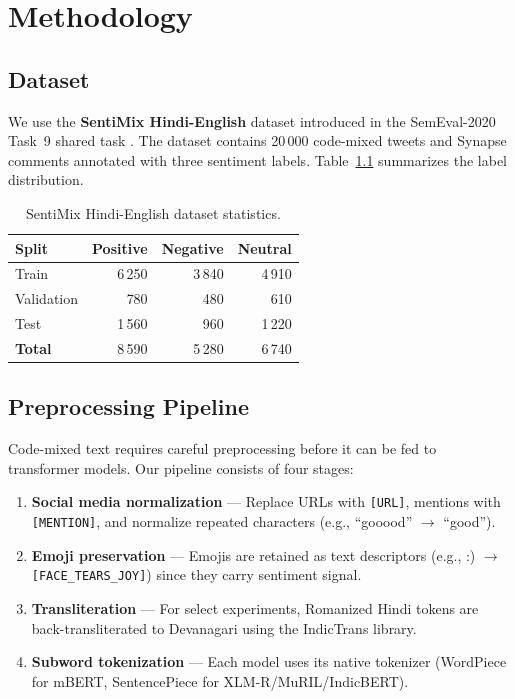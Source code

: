 \documentclass[12pt,a4paper]{report}
\begin{document}
\chapter{Methodology}

\section{Dataset}

We use the \textbf{SentiMix Hindi-English} dataset introduced in the SemEval-2020 Task~9 shared task \cite{patwa2020}. The dataset contains 20\,000 code-mixed tweets and Synapse comments annotated with three sentiment labels. Table~\ref{tab:dataset} summarizes the label distribution.

\begin{table}[htbp]
\centering
\caption{SentiMix Hindi-English dataset statistics.}
\label{tab:dataset}
\begin{tabular}{@{}lrrr@{}}
\toprule
\textbf{Split} & \textbf{Positive} & \textbf{Negative} & \textbf{Neutral} \\
\midrule
Train      & 6\,250 & 3\,840 & 4\,910 \\
Validation &   780  &   480  &   610  \\
Test       & 1\,560 &   960  & 1\,220 \\
\midrule
\textbf{Total} & 8\,590 & 5\,280 & 6\,740 \\
\bottomrule
\end{tabular}
\end{table}

\section{Preprocessing Pipeline}

Code-mixed text requires careful preprocessing before it can be fed to transformer models. Our pipeline consists of four stages:

\begin{enumerate}[nosep,itemsep=3pt]
  \item \textbf{Social media normalization} — Replace URLs with \texttt{[URL]}, mentions with \texttt{[MENTION]}, and normalize repeated characters (e.g., ``gooood'' $\rightarrow$ ``good'').
  \item \textbf{Emoji preservation} — Emojis are retained as text descriptors (e.g., :) $\rightarrow$ \texttt{[FACE\_TEARS\_JOY]}) since they carry sentiment signal.
  \item \textbf{Transliteration} — For select experiments, Romanized Hindi tokens are back-transliterated to Devanagari using the IndicTrans library.
  \item \textbf{Subword tokenization} — Each model uses its native tokenizer (WordPiece for mBERT, SentencePiece for XLM-R/MuRIL/IndicBERT).
\end{enumerate}
\end{document}
